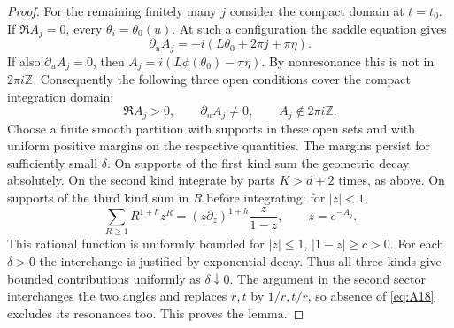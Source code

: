 \documentclass[11pt,a4paper]{article}
\numberwithin{equation}{section}
\theoremstyle{plain}
\theoremstyle{definition}
\begin{document}
\begin{proof}
For the remaining finitely many $j$ consider the compact domain at $t=t_0$. If $\Re A_j=0$, every $\theta_i=\theta_0(u)$. At such a configuration the saddle equation gives
\[
\partial_u A_j=-i(L\theta_0+2\pi j+\pi\eta).
\]
If also $\partial_u A_j=0$, then $A_j=i(L\phi(\theta_0)-\pi\eta)$. By nonresonance this is not in $2\pi i\mathbb Z$. Consequently the following three open conditions cover the compact integration domain:
\[
\Re A_j>0,\qquad \partial_u A_j\ne0,\qquad A_j\notin2\pi i\mathbb Z.
\]
Choose a finite smooth partition with supports in these open sets and with uniform positive margins on the respective quantities. The margins persist for sufficiently small $\delta$. On supports of the first kind sum the geometric decay absolutely. On the second kind integrate by parts $K>d+2$ times, as above. On supports of the third kind sum in $R$ before integrating: for $|z|<1$,
\[
\sum_{R\ge1}R^{1+h}z^R=(z\partial_z)^{1+h}\frac{z}{1-z},\qquad z=e^{-A_j}.
\]
This rational function is uniformly bounded for $|z|\le1$, $|1-z|\ge c>0$. For each $\delta>0$ the interchange is justified by exponential decay. Thus all three kinds give bounded contributions uniformly as $\delta\downarrow0$. The argument in the second sector interchanges the two angles and replaces $r,t$ by $1/r,t/r$, so absence of \eqref{eq:A18} excludes its resonances too. This proves the lemma.
\end{proof}
\end{document}
